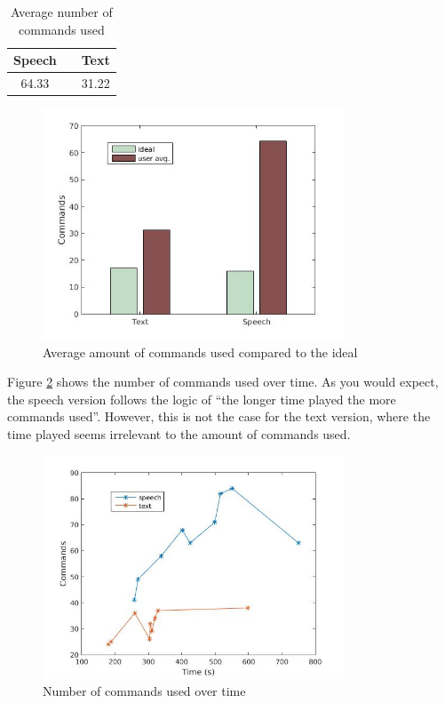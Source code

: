 \begin{table}[ht]
  \centering
  \begin{tabular}{ccc}
    \toprule
    Speech &   & Text\\
    \midrule
    64.33 &   & 31.22\\
    \bottomrule
  \end{tabular}
  \caption{Average number of commands used}\label{avg_cmd} %
\end{table}

\begin{figure}[ht]
  \centering
  \includegraphics[width=0.8\textwidth]{images/ideal_cmd.jpg}
  \caption{Average amount of commands used compared to the ideal}\label{ideal_cmd}
\end{figure}

Figure \ref{time_cmd} shows the number of commands used over time. As you would expect, the speech version follows the logic of ``the longer time played the more commands used''. However, this is not the case for the text version, where the time played seems irrelevant to the amount of commands used.

\begin{figure}[ht]
  \centering
  \includegraphics[width=0.8\textwidth]{images/time_cmd.jpg} %
  \caption{Number of commands used over time}\label{time_cmd}
\end{figure}

